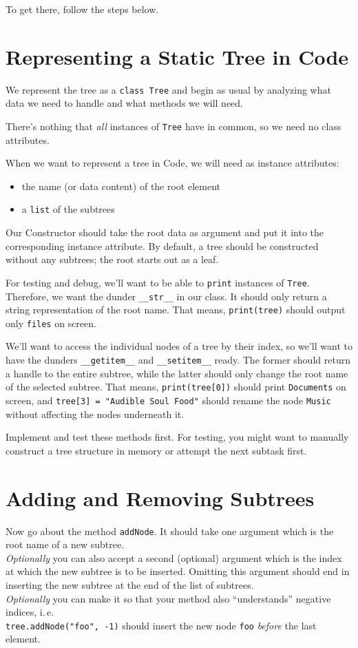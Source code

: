 \documentclass[
	english,
	fontsize=10pt,
	parskip=half,
	titlepage=true,
	DIV=12
]{scrartcl}
\newcommand*{\inPy}[1]{\texttt{#1}}
\newcommand*{\ie}{i.\,e.\xspace}
\begin{document}
To get there, follow the steps below.

\section{Representing a Static Tree in Code}
We represent the tree as a \inPy{class Tree} and begin as usual by analyzing what data we need to handle and what methods we will need.

There's nothing that \emph{all} instances of \texttt{Tree} have in common, so we need no class attributes.

When we want to represent a tree in Code, we will need as instance attributes:
\begin{itemize}
\item the name (or data content) of the root element
\item a \inPy{list} of the subtrees
\end{itemize}

Our Constructor should take the root data as argument and put it into the corresponding instance attribute. By default, a tree should be constructed without any subtrees; the root starts out as a leaf.

For testing and debug, we'll want to be able to \inPy{print} instances of \texttt{Tree}. Therefore, we want the dunder \inPy{__str__} in our class. It should only return a string representation of the root name. That means, \inPy{print(tree)} should output only \texttt{files} on screen.

We'll want to access the individual nodes of a tree by their index, so we'll want to have the dunders \inPy{__getitem__} and \inPy{__setitem__} ready. The former should return a handle to the entire subtree, while the latter should only change the root name of the selected subtree. That means, \inPy{print(tree[0])} should print \texttt{Documents} on screen, and \texttt{tree[3] = "Audible Soul Food"} should rename the node \texttt{Music} without affecting the nodes underneath it.

Implement and test these methods first. For testing, you might want to manually construct a tree structure in memory or attempt the next subtask first.

\section{Adding and Removing Subtrees}
Now go about the method \texttt{addNode}. It should take one argument which is the root name of a new subtree.\\
\emph{Optionally} you can also accept a second (optional) argument which is the index at which the new subtree is to be inserted. Omitting this argument should end in inserting the new subtree at the end of the list of subtrees.\\
\emph{Optionally} you can make it so that your method also \enquote{understands} negative indices, \ie\\
\texttt{tree.addNode("foo", -1)} should insert the new node \texttt{foo} \emph{before} the last element.
\end{document}
